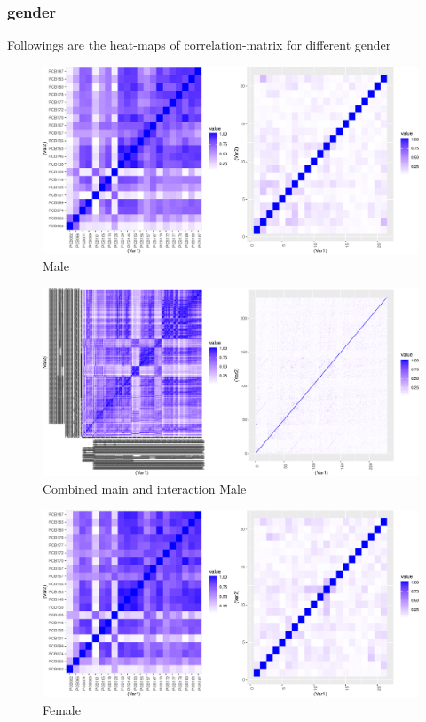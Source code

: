 \documentclass[]{article}
\begin{document}
\subsubsection{gender}\label{gender}

Followings are the heat-maps of correlation-matrix for different gender

\begin{figure}
\centering
\includegraphics{PCBs_covariance_files/figure-latex/unnamed-chunk-11-1.pdf}
\caption{Male}
\end{figure}

\begin{figure}
\centering
\includegraphics{PCBs_covariance_files/figure-latex/unnamed-chunk-12-1.pdf}
\caption{Combined main and interaction Male}
\end{figure}

\begin{figure}
\centering
\includegraphics{PCBs_covariance_files/figure-latex/unnamed-chunk-13-1.pdf}
\caption{Female}
\end{figure}
\end{document}

